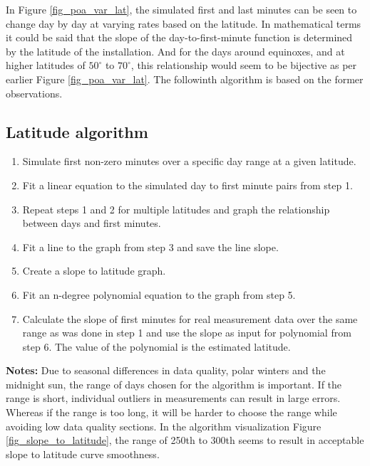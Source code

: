 In Figure \ref{fig_poa_var_lat}, the simulated first and last minutes can be seen to change day by day at varying rates based on the latitude. In mathematical terms it could be said that the slope of the day-to-first-minute function is determined by the latitude of the installation. And for the days around equinoxes, and at higher latitudes of $50^\circ$ to $70^\circ$, this relationship would seem to be bijective as per earlier Figure \ref{fig_poa_var_lat}. The followinth algorithm is based on the former observations.


\hfill


\subsection{Latitude algorithm}
\begin{enumerate}
  \item Simulate first non-zero minutes over a specific day range at a given latitude.
  
  \item Fit a linear equation to the simulated day to first minute pairs from step 1.
  
  \item Repeat steps 1 and 2 for multiple latitudes and graph the relationship between days and first minutes.
  
  \item Fit a line to the graph from step 3 and save the line slope.
  
  \item Create a slope to latitude graph.
  
  \item Fit an n-degree polynomial equation to the graph from step 5.
  
  \item Calculate the slope of first minutes for real measurement data over the same range as was done in step 1 and use the slope as input for polynomial from step 6. The value of the polynomial is the estimated latitude.
  
\end{enumerate}

\noindent
\textbf{Notes:}
Due to seasonal differences in data quality, polar winters and the midnight sun, the range of days chosen for the algorithm is important. If the range is short, individual outliers in measurements can result in large errors. Whereas if the range is too long, it will be harder to choose the range while avoiding low data quality sections. In the algorithm visualization Figure \ref{fig_slope_to_latitude}, the range of 250th to 300th seems to result in acceptable slope to latitude curve smoothness.
\newpage

